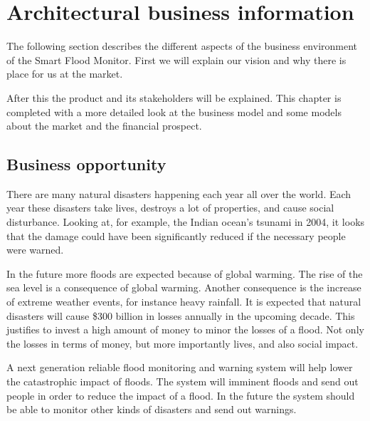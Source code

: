 
\clearpage
\chapter{Architectural business information}
\label{ch:business}
The following section describes the different aspects of the business environment of the Smart Flood Monitor. First we will explain our vision and why there is place for us at the market.
 
After this the product and its stakeholders will be explained. This chapter is completed with a more detailed look at the business model and some models about the market and the financial prospect.


\section{Business opportunity}
There are many natural disasters happening each year all over the world. Each year these disasters take lives, destroys a lot of properties, and cause social disturbance.
Looking at, for example, the Indian ocean's tsunami in 2004, it looks that the damage could have been significantly reduced if the necessary people were warned.  %

In the future more floods are expected because of global warming. The rise of the sea level is a consequence of global warming. Another consequence is the increase of extreme weather events, for instance heavy rainfall. It is expected that natural disasters will cause \$300 billion in losses annually in the upcoming decade. This justifies to invest a high amount of money to minor the losses of a flood. Not only the losses in terms of money, but more importantly lives, and also social impact. %

A next generation reliable flood monitoring and warning system will help lower the catastrophic impact of floods. The system will imminent floods and send out people in order to reduce the impact of a flood. In the future the system should be able to monitor other kinds of disasters and send out warnings. 


